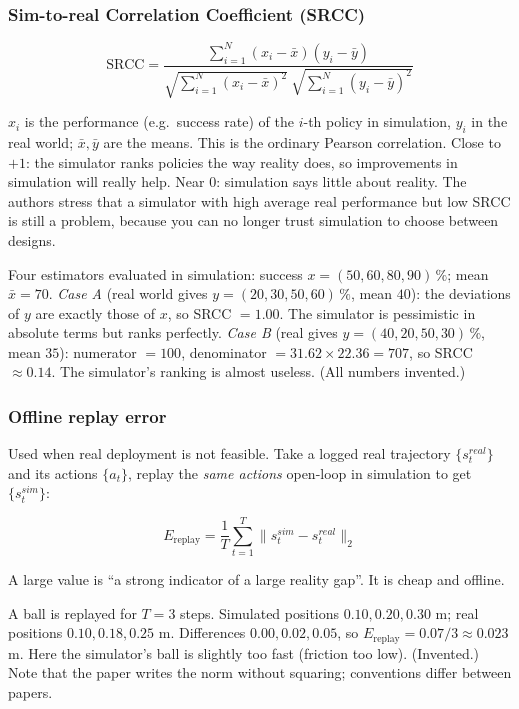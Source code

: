 \documentclass[11pt,a4paper]{article}
\begin{document}
\subsubsection*{Sim-to-real Correlation Coefficient (SRCC)}
\begin{eqbox}
\[
\mathrm{SRCC}=\frac{\sum_{i=1}^{N}(x_i-\bar x)(y_i-\bar y)}
{\sqrt{\sum_{i=1}^{N}(x_i-\bar x)^2}\ \sqrt{\sum_{i=1}^{N}(y_i-\bar y)^2}}
\]
\end{eqbox}
$x_i$ is the performance (e.g.\ success rate) of the $i$-th policy in simulation, $y_i$ in the real
world; $\bar x,\bar y$ are the means. This is the ordinary Pearson correlation. Close to $+1$: the
simulator ranks policies the way reality does, so improvements in simulation will really help.
Near $0$: simulation says little about reality. The authors stress that a simulator with high
average real performance but low SRCC is still a problem, because you can no longer trust
simulation to choose between designs.

\begin{toy}
Four estimators evaluated in simulation: success $x=(50,60,80,90)\,\%$; mean $\bar x=70$.
\emph{Case A} (real world gives $y=(20,30,50,60)\,\%$, mean $40$): the deviations of $y$ are exactly
those of $x$, so SRCC $=1.00$. The simulator is pessimistic in absolute terms but ranks perfectly.
\emph{Case B} (real gives $y=(40,20,50,30)\,\%$, mean $35$): numerator $=100$, denominator
$=31.62\times 22.36=707$, so SRCC $\approx0.14$. The simulator's ranking is almost useless. (All
numbers invented.)
\end{toy}

\subsubsection*{Offline replay error}
Used when real deployment is not feasible. Take a logged real trajectory $\{s^{real}_t\}$ and its
actions $\{a_t\}$, replay the \emph{same actions} open-loop in simulation to get $\{s^{sim}_t\}$:
\begin{eqbox}
\[
E_{\mathrm{replay}}=\frac1T\sum_{t=1}^{T}\big\|s^{sim}_t-s^{real}_t\big\|_2
\]
\end{eqbox}
A large value is ``a strong indicator of a large reality gap''. It is cheap and offline.

\begin{toy}
A ball is replayed for $T=3$ steps. Simulated positions $0.10, 0.20, 0.30$ m; real positions
$0.10, 0.18, 0.25$ m. Differences $0.00, 0.02, 0.05$, so $E_{\mathrm{replay}}=0.07/3\approx0.023$ m.
Here the simulator's ball is slightly too fast (friction too low). (Invented.) Note that the
paper writes the norm without squaring; conventions differ between papers.
\end{toy}
\end{document}
